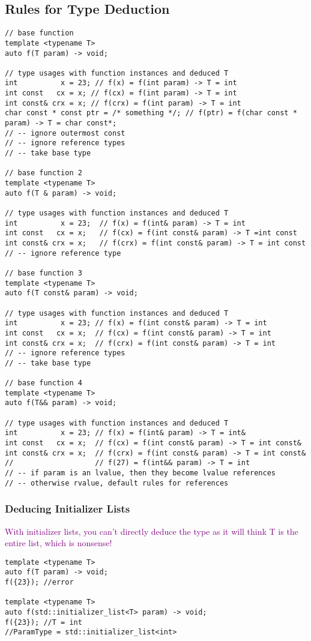 \documentclass[main.tex,fontsize=8pt,paper=a4,paper=portrait,DIV=calc,]{scrartcl}
\begin{document}
\subsection{Rules for Type Deduction}
\begin{lstlisting}
// base function
template <typename T>
auto f(T param) -> void;

// type usages with function instances and deduced T
int          x = 23; // f(x) = f(int param) -> T = int
int const   cx = x; // f(cx) = f(int param) -> T = int
int const& crx = x; // f(crx) = f(int param) -> T = int
char const * const ptr = /* something */; // f(ptr) = f(char const * param) -> T = char const*;
// -- ignore outermost const
// -- ignore reference types
// -- take base type

// base function 2 
template <typename T>
auto f(T & param) -> void;

// type usages with function instances and deduced T
int          x = 23;  // f(x) = f(int& param) -> T = int
int const   cx = x;   // f(cx) = f(int const& param) -> T =int const
int const& crx = x;   // f(crx) = f(int const& param) -> T = int const
// -- ignore reference type

// base function 3
template <typename T>
auto f(T const& param) -> void;

// type usages with function instances and deduced T
int          x = 23; // f(x) = f(int const& param) -> T = int
int const   cx = x;  // f(cx) = f(int const& param) -> T = int
int const& crx = x;  // f(crx) = f(int const& param) -> T = int
// -- ignore reference types
// -- take base type

// base function 4
template <typename T>
auto f(T&& param) -> void;

// type usages with function instances and deduced T
int          x = 23; // f(x) = f(int& param) -> T = int&
int const   cx = x;  // f(cx) = f(int const& param) -> T = int const&
int const& crx = x;  // f(crx) = f(int const& param) -> T = int const&
//                   // f(27) = f(int&& param) -> T = int 
// -- if param is an lvalue, then they become lvalue references
// -- otherwise rvalue, default rules for references

\end{lstlisting}

\subsubsection{Deducing Initializer Lists}
\textcolor{purple}{With initializer lists, you can't directly deduce the type as it will think T is the entire list, which is nonsense!}
\begin{lstlisting}
template <typename T>
auto f(T param) -> void;
f({23}); //error

template <typename T>
auto f(std::initializer_list<T> param) -> void;
f({23}); //T = int
//ParamType = std::initializer_list<int>
\end{lstlisting}
\end{document}
